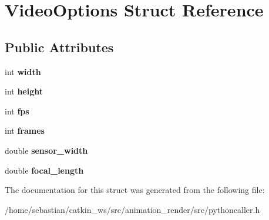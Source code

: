 \hypertarget{structVideoOptions}{}\section{Video\+Options Struct Reference}
\label{structVideoOptions}
\subsection*{Public Attributes}
\begin{DoxyCompactItemize}
\item 
int {\bfseries width}\hypertarget{structVideoOptions_ad47a8f090805a349fc6f200d21c71549}{}\label{structVideoOptions_ad47a8f090805a349fc6f200d21c71549}

\item 
int {\bfseries height}\hypertarget{structVideoOptions_a9031cd944b0dd5c6e6c135afb0db5b26}{}\label{structVideoOptions_a9031cd944b0dd5c6e6c135afb0db5b26}

\item 
int {\bfseries fps}\hypertarget{structVideoOptions_a73674e8c88aa4f459c127511be49c0b2}{}\label{structVideoOptions_a73674e8c88aa4f459c127511be49c0b2}

\item 
int {\bfseries frames}\hypertarget{structVideoOptions_a644e265827a217ce4e7eabc2f226904d}{}\label{structVideoOptions_a644e265827a217ce4e7eabc2f226904d}

\item 
double {\bfseries sensor\+\_\+width}\hypertarget{structVideoOptions_ae16bb057999c1278e501d27f35cc0b85}{}\label{structVideoOptions_ae16bb057999c1278e501d27f35cc0b85}

\item 
double {\bfseries focal\+\_\+length}\hypertarget{structVideoOptions_a13b51ddc57b1ab2a3696d9edbcb74107}{}\label{structVideoOptions_a13b51ddc57b1ab2a3696d9edbcb74107}

\end{DoxyCompactItemize}


The documentation for this struct was generated from the following file\+:\begin{DoxyCompactItemize}
\item 
/home/sebastian/catkin\+\_\+ws/src/animation\+\_\+render/src/pythoncaller.\+h\end{DoxyCompactItemize}
